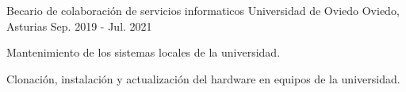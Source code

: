 \begin{cventries}
    \cventry
    {Becario de colaboración de servicios informaticos} %
    {Universidad de Oviedo} %
    {Oviedo, Asturias} %
    {Sep. 2019 - Jul. 2021} %
    {
        \begin{cvitems} %
            \item {Mantenimiento de los sistemas locales de la universidad.}
            \item {Clonación, instalación y actualización del hardware en equipos de la universidad.}
        \end{cvitems}
    }

\end{cventries}
